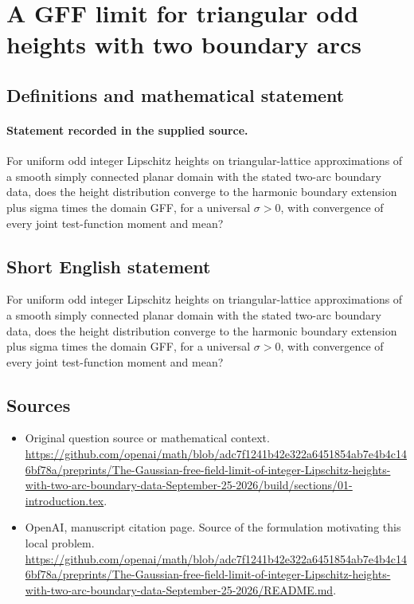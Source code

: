 \documentclass[11pt]{article}
\begin{document}
\section*{A GFF limit for triangular odd heights with two boundary arcs}\label{statement}
\subsection{Definitions and mathematical statement}
\paragraph{Statement recorded in the supplied source.}
For uniform odd integer Lipschitz heights on triangular-lattice approximations of a smooth simply connected planar domain with the stated two-arc boundary data, does the height distribution converge to the harmonic boundary extension plus sigma times the domain GFF, for a universal $\sigma >0$, with convergence of every joint test-function moment and mean?
\subsection{Short English statement}
For uniform odd integer Lipschitz heights on triangular-lattice approximations of a smooth simply connected planar domain with the stated two-arc boundary data, does the height distribution converge to the harmonic boundary extension plus sigma times the domain GFF, for a universal $\sigma >0$, with convergence of every joint test-function moment and mean?
\subsection{Sources}
\begin{itemize}
\item[S1] Original question source or mathematical context.
\url{https://github.com/openai/math/blob/adc7f1241b42e322a6451854ab7e4b4c146bf78a/preprints/The-Gaussian-free-field-limit-of-integer-Lipschitz-heights-with-two-arc-boundary-data-September-25-2026/build/sections/01-introduction.tex}.
\item[S2] OpenAI, manuscript citation page. Source of the formulation motivating this local problem.
\url{https://github.com/openai/math/blob/adc7f1241b42e322a6451854ab7e4b4c146bf78a/preprints/The-Gaussian-free-field-limit-of-integer-Lipschitz-heights-with-two-arc-boundary-data-September-25-2026/README.md}.
\end{itemize}
\end{document}
